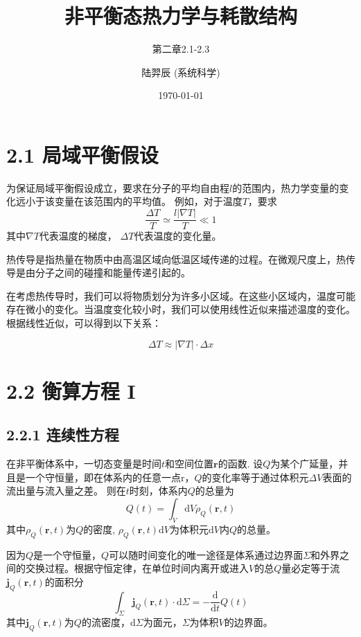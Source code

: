 \documentclass[10pt,aspectratio=43,mathserif,table]{ctexbeamer}
\title{非平衡态热力学与耗散结构}
\subtitle{第二章2.1-2.3}
\author{陆羿辰 (系统科学)}
\institute{华侨大学\quad 数学科学学院}
\date{\today}
\begin{document}

\frame{\titlepage}

\begin{frame}
    \tableofcontents
\end{frame}

\section{2.1 局域平衡假设}

\begin{frame}

    为保证局域平衡假设成立，要求在分子的平均自由程$l$的范围内，热力学变量的变化远小于该变量在该范围内的平均值。
    例如，对于温度$T$，要求
    \[
        \frac{\Delta T}{T}\simeq \frac{l\left| \nabla T \right|}{T}\ll 1
    \]
    其中$\nabla T$代表温度的梯度， $\Delta T$代表温度的变化量。

    热传导是指热量在物质中由高温区域向低温区域传递的过程。在微观尺度上，热传导是由分子之间的碰撞和能量传递引起的。

    在考虑热传导时，我们可以将物质划分为许多小区域。在这些小区域内，温度可能存在微小的变化。当温度变化较小时，我们可以使用线性近似来描述温度的变化。根据线性近似，可以得到以下关系：

    $$
    \Delta T \approx \left| \nabla T \right| \cdot \Delta x
    $$


\end{frame}

\section{2.2 衡算方程 I}

\subsection{2.2.1 连续性方程}

\begin{frame}
    在非平衡体系中，一切态变量是时间$t$和空间位置$\mathbf{r}$的函数.
    设$Q$为某个广延量，并且是一个守恒量，即在体系内的任意一点$\mathrm{r}$，$Q$的变化率等于通过体积元$\Delta V$表面的流出量与流入量之差。
    则在$t$时刻，体系内$Q$的总量为
    $$
    Q\left( t \right) =\int_V{\mathrm{d}V\rho _Q\left( \mathbf{r}, t \right)}
    $$
    其中$\rho _Q\left( \mathbf{r}, t \right)$为$Q$的密度, $\rho _Q\left( \mathbf{r}, t \right)\mathrm{d}V$为体积元$\mathrm{d}V$内$Q$的总量。

    因为$Q$是一个守恒量，$Q$可以随时间变化的唯一途径是体系通过边界面$\Sigma$和外界之间的交换过程。根据守恒定律，在单位时间内离开或进入$V$的总$Q$量必定等于流$\mathbf{j}_Q(\mathbf{r},t)$的面积分
    $$
    \int_{\Sigma}{\mathbf{j}_Q\left( \mathbf{r}, t \right)\cdot \mathrm{d}\Sigma}=-\frac{\mathrm{d} }{\mathrm{d} t}Q\left( t \right)
    $$
    其中$\mathbf{j}_Q\left( \mathbf{r}, t \right)$为$Q$的流密度，$\mathrm{d}\Sigma$为面元，$\Sigma$为体积$V$的边界面。

\end{frame}
\end{document}
